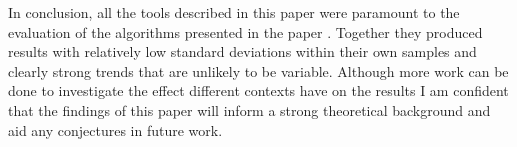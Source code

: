 In conclusion, all the tools described in this paper were paramount to the
evaluation of the algorithms presented in the paper \relalg{}. Together they
produced results with relatively low standard deviations within their own
samples and clearly strong trends that are unlikely to be variable. Although
more work can be done to investigate the effect different contexts have on the
results I am confident that the findings of this paper will inform a strong
theoretical background and aid any conjectures in future work.
